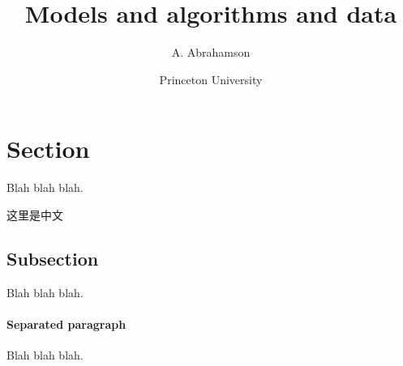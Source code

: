 \documentclass[12pt]{article}
\begin{document}
\title{\textsf{Models and algorithms and data}}
\author{\textsf{A. Abrahamson}}
\date{\textsf{Princeton University}}
\maketitle

\section{Section}

Blah blah blah.

这里是中文

\subsection{Subsection}

Blah blah blah.

\paragraph{Separated paragraph} Blah blah blah.



\end{document}
